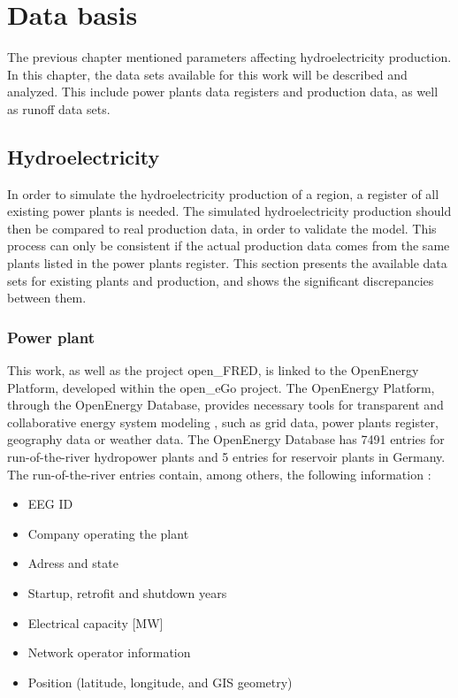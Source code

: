 \chapter{Data basis}
\label{chap:data_basis}

The previous chapter mentioned parameters affecting hydroelectricity production. In this chapter, the data sets available for this work will be described and analyzed. This include power plants data registers and production data, as well as runoff data sets. 

\section{Hydroelectricity}
\label{sec:db_hydroelec}
In order to simulate the hydroelectricity production of a region, a register of all existing power plants is needed. The simulated hydroelectricity production should then be compared to real production data, in order to validate the model. This process can only be consistent if the actual production data comes from the same plants listed in the power plants register. This section presents the available data sets for existing plants and production, and shows the significant discrepancies between them. 

\subsection{Power plant}
\label{sub:hpp_reg}
This work, as well as the project open\_FRED, is linked to the OpenEnergy Platform, developed within the open\_eGo project. The OpenEnergy Platform, through the OpenEnergy Database, provides necessary tools for transparent and collaborative energy system modeling \cite{oedb}, such as grid data, power plants register, geography data or weather data. The OpenEnergy Database has 7491 entries for run-of-the-river hydropower plants and 5 entries for reservoir plants in Germany. The run-of-the-river entries contain, among others, the following information :
\begin{itemize}
\itemsep0em 
 \item EEG ID
 \item Company operating the plant
 \item Adress and state
 \item Startup, retrofit and shutdown years
 \item Electrical capacity [\unit{MW}]
 \item Network operator information
 \item Position (latitude, longitude, and GIS geometry)
\end{itemize}

